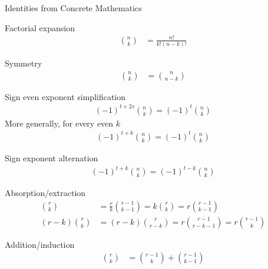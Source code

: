 Identities from Concrete Mathematics~\cite[p. 174]{graham1994concrete}
\begin{identity}
    Factorial expansion
    \begin{align*}
        \binom{n}{k} &= \frac{n!}{k!(n-k)!}
    \end{align*}
\end{identity}

\begin{identity}
    Symmetry
    \begin{align*}
        \binom{n}{k} &= \binom{n}{n-k}
    \end{align*}
\end{identity}

\begin{identity}
    Sign even exponent simplification
    \begin{align*}
    (-1)
        ^{t+2s} \binom{n}{k} = (-1)^{t} \binom{n}{k}
    \end{align*}
    More generally, for every even $k$
    \begin{align*}
    (-1)
        ^{t+k} \binom{n}{k} = (-1)^{t} \binom{n}{k}
    \end{align*}
\end{identity}

\begin{identity}
    Sign exponent alternation
    \begin{align*}
    (-1)
        ^{t+k} \binom{n}{k} = (-1)^{t-k} \binom{n}{k}
    \end{align*}
\end{identity}

\begin{identity}
    Absorption/extraction
    \begin{align*}
        \binom{r}{k}       &= \frac{r}{k} \binom{r-1}{k-1} = k \binom{r}{k} = r \binom{r-1}{k-1} \\
        (r-k) \binom{r}{k} &= (r-k) \binom{r}{r-k} = r \binom{r-1}{r-k-1} = r \binom{r-1}{k}
    \end{align*}
\end{identity}

\begin{identity}
    Addition/induction
    \begin{align*}
        \binom{r}{k} &= \binom{r-1}{k} + \binom{r-1}{k-1}
    \end{align*}
\end{identity}

